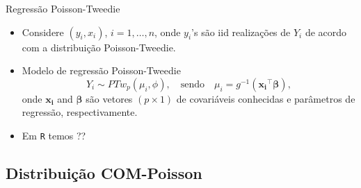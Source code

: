 \documentclass[10pt, aspectratio=169]{beamer}\usepackage[]{graphicx}\usepackage[]{color}
\begin{document}

\begin{frame}{Regressão Poisson-Tweedie}
\begin{itemize}
\item Considere $(y_i, x_i)$, $i = 1,\ldots, n$, onde $y_i$'s são iid 
realizações de $Y_i$ de acordo com a distribuição Poisson-Tweedie.
\vspace{0,5cm}
\item Modelo de regressão Poisson-Tweedie
$$Y_i \sim PTw_{p}(\mu_i, \phi), \quad  \text{sendo} \quad 
\mu_i = g^{-1}(\boldsymbol{x_i}^{\top} \boldsymbol{\beta}),$$
onde $\boldsymbol{x_i}$ and $\boldsymbol{\beta}$ são vetores $(p \times 1)$
de covariáveis conhecidas e parâmetros de regressão, respectivamente.
\vspace{0,5cm}
\item Em \texttt{R} temos ??
\end{itemize}
\end{frame}

\subsection{Distribuição COM-Poisson}
\end{document}
